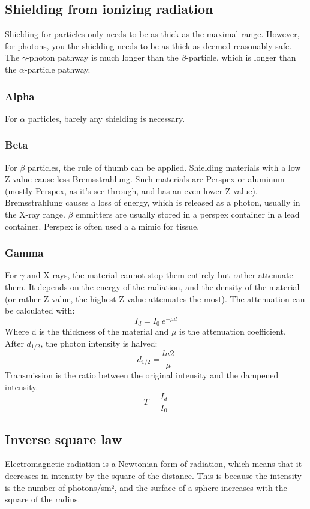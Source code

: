 \subsection{}


\subsection{Shielding from ionizing radiation}
Shielding for particles only needs to be as thick as the maximal range. However, for photons, you the shielding needs to be as thick as deemed reasonably safe. \\
The $\gamma$-photon pathway is much longer than the $\beta$-particle, which is longer than the $\alpha$-particle pathway.
\subsubsection{Alpha}
For $\alpha$ particles, barely any shielding is necessary. 
\subsubsection{Beta}
For $\beta$ particles, the rule of thumb can be applied. Shielding materials with a low Z-value cause less Bremsstrahlung. Such materials are Perspex or aluminum (mostly Perspex, as it's see-through, and has an even lower Z-value). Bremsstrahlung causes a loss of energy, which is released as a photon, usually in the X-ray range. $\beta$ emmitters are usually stored in a perspex container in a lead container. Perspex is often used a a mimic for tissue.
\subsubsection{Gamma}
For $\gamma$ and X-rays, the material cannot stop them entirely but rather attenuate them. It depends on the energy of the radiation, and the density of the material (or rather Z value, the highest Z-value attenuates the most). The attenuation can be calculated with:
\[  I_d = I_0\ e^{-\mu d}   \]
Where d is the thickness of the material and $\mu$ is the attenuation coefficient. After $d_{1/2}$, the photon intensity is halved:
\[  d_{1/2} = \frac{ln2}{\mu}  \]
Transmission is the ratio between the original intensity and the dampened intensity.
\[  T = \frac{I_d}{I_0}	 \]

\subsection{Inverse square law}
Electromagnetic radiation is a Newtonian form of radiation, which means that it decreases in intensity by the square of the distance. This is because the intensity is the number of photons/sm², and the surface of a sphere increases with the square of the radius.

